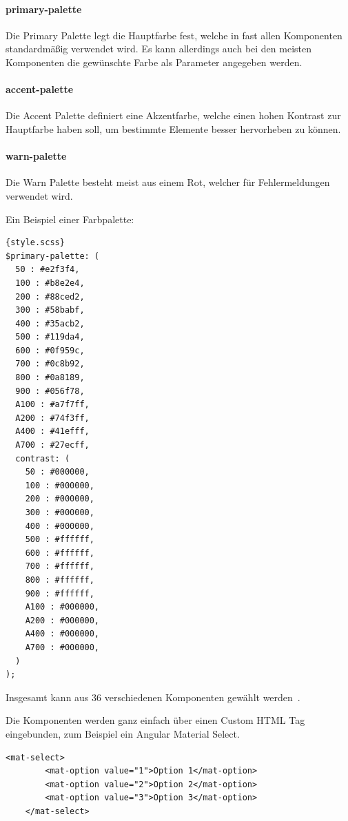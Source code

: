 \paragraph{primary-palette}
Die Primary Palette legt die Hauptfarbe fest, welche in fast allen Komponenten standardmäßig verwendet wird.
Es kann allerdings auch bei den meisten Komponenten die gewünschte Farbe als Parameter angegeben werden.
\paragraph{accent-palette}
Die Accent Palette definiert eine Akzentfarbe, welche einen hohen Kontrast zur Hauptfarbe haben soll, um bestimmte Elemente
besser hervorheben zu können.
\paragraph{warn-palette}
Die Warn Palette besteht meist aus einem Rot, welcher für Fehlermeldungen verwendet wird.


Ein Beispiel einer Farbpalette:

\begin{lstlisting}[label={lst:custom-primary-color-palette}]{style.scss}
$primary-palette: (
  50 : #e2f3f4,
  100 : #b8e2e4,
  200 : #88ced2,
  300 : #58babf,
  400 : #35acb2,
  500 : #119da4,
  600 : #0f959c,
  700 : #0c8b92,
  800 : #0a8189,
  900 : #056f78,
  A100 : #a7f7ff,
  A200 : #74f3ff,
  A400 : #41efff,
  A700 : #27ecff,
  contrast: (
    50 : #000000,
    100 : #000000,
    200 : #000000,
    300 : #000000,
    400 : #000000,
    500 : #ffffff,
    600 : #ffffff,
    700 : #ffffff,
    800 : #ffffff,
    900 : #ffffff,
    A100 : #000000,
    A200 : #000000,
    A400 : #000000,
    A700 : #000000,
  )
);
\end{lstlisting}

Insgesamt kann aus 36 verschiedenen Komponenten gewählt werden~\cite{angular-material-component-overview,angular-material-description,angular-material-with-angular}.

Die Komponenten werden ganz einfach über einen Custom HTML Tag eingebunden, zum Beispiel ein Angular Material Select.

\begin{lstlisting}[label={lst:custom-html-tag}]
    <mat-select>
        <mat-option value="1">Option 1</mat-option>
        <mat-option value="2">Option 2</mat-option>
        <mat-option value="3">Option 3</mat-option>
    </mat-select>
\end{lstlisting}

